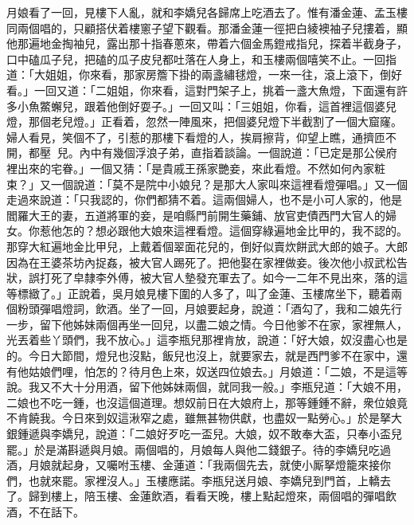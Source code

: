 月娘看了一回，見樓下人亂，就和李嬌兒各歸席上吃酒去了。惟有潘金蓮、孟玉樓同兩個唱的，只顧搭伏着樓窻子望下觀看。那潘金蓮一徑把白綾襖袖子兒摟着，顯他那遍地金掏袖兒，露出那十指春蔥來，帶着六個金馬鐙戒指兒，探着半截身子，口中磕瓜子兒，把磕的瓜子皮兒都吐落在人身上，{}和玉樓兩個嘻笑不止。{}一回指道：「大姐姐，你來看，那家房簷下掛的兩盞繡毬燈，一來一往，滾上滾下，倒好看。」一回又道：「二姐姐，你來看，這對門架子上，挑着一盞大魚燈，下面還有許多小魚鱉蠏兒，跟着他倒好耍子。」一回又叫：「三姐姐，你看，這首裡這個婆兒燈，那個老兒燈。」正看着，忽然一陣風來，把個婆兒燈下半截割了一個大窟窿。{}婦人看見，笑個不了，引惹的那樓下看燈的人，挨肩擦背，仰望上瞧，通擠匝不開，都壓𨇽𨇽兒。內中有幾個浮浪子弟，直指着談論。一個說道：「已定是那公侯府裡出來的宅眷。」一個又猜：「是貴戚王孫家艷妾，來此看燈。不然如何內家粧束？」又一個說道：「莫不是院中小娘兒？是那大人家叫來這裡看燈彈唱。」又一個走過來說道：「只我認的，你們都猜不着。這兩個婦人，也不是小可人家的，他是閻羅大王的妻，五道將軍的妾，是咱縣門前開生藥鋪、放官吏債西門大官人的婦女。你惹他怎的？想必跟他大娘來這裡看燈。這個穿綠遍地金比甲的，我不認的。{}那穿大紅遍地金比甲兒，上戴着個翠面花兒的，倒好似賣炊餅武大郎的娘子。大郎因為在王婆茶坊內捉姦，被大官人踢死了。把他娶在家裡做妾。後次他小叔武松告狀，誤打死了皁隸李外傅，被大官人墊發充軍去了。{}如今一二年不見出來，落的這等標緻了。」正說着，吳月娘見樓下圍的人多了，叫了金蓮、玉樓席坐下，聽着兩個粉頭彈唱燈詞，飲酒。坐了一回，月娘要起身，說道：「酒勾了，我和二娘先行一步，留下他姊妹兩個再坐一回兒，以盡二娘之情。今日他爹不在家，家裡無人，光丟着些丫頭們，{}我不放心。」這李瓶兒那裡肯放，說道：「好大娘，奴沒盡心也是的。今日大節間，燈兒也沒點，飯兒也沒上，就要家去，就是西門爹不在家中，還有他姑娘們哩，怕怎的？待月色上來，奴送四位娘去。」月娘道：「二娘，不是這等說。我又不大十分用酒，留下他姊妹兩個，就同我一般。」李瓶兒道：「大娘不用，二娘也不吃一鍾，也沒這個道理。想奴前日在大娘府上，那等鍾鍾不辭，衆位娘竟不肯饒我。今日來到奴這湫窄之處，雖無甚物供獻，也盡奴一點勞心。」於是拏大銀鍾遞與李嬌兒，說道：「二娘好歹吃一盃兒。大娘，奴不敢奉大盃，只奉小盃兒罷。」於是滿斟遞與月娘。兩個唱的，月娘每人與他二錢銀子。待的李嬌兒吃過酒，月娘就起身，又囑咐玉樓、金蓮道：「我兩個先去，就使小厮拏燈籠來接你們，也就來罷。家裡沒人。」玉樓應諾。李瓶兒送月娘、李嬌兒到門首，上轎去了。歸到樓上，陪玉樓、金蓮飲酒，看看天晚，樓上點起燈來，兩個唱的彈唱飲酒，不在話下。

